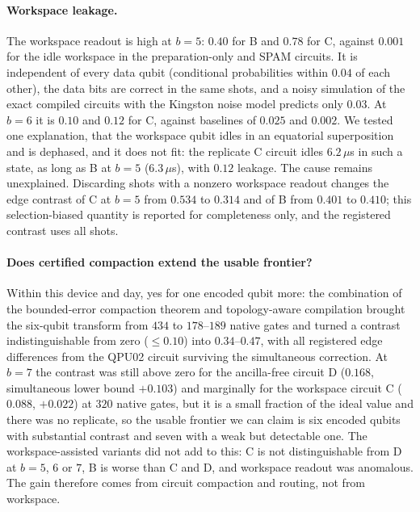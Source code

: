 \documentclass[11pt]{article}
\begin{document}
\paragraph{Workspace leakage.} The workspace readout is high at $b=5$: $0.40$ for B and $0.78$ for C, against $0.001$ for the idle workspace in the preparation-only and SPAM circuits. It is independent of every data qubit (conditional probabilities within $0.04$ of each other), the data bits are correct in the same shots, and a noisy simulation of the exact compiled circuits with the Kingston noise model predicts only $0.03$. At $b=6$ it is $0.10$ and $0.12$ for C, against baselines of $0.025$ and $0.002$. We tested one explanation, that the workspace qubit idles in an equatorial superposition and is dephased, and it does not fit: the replicate C circuit idles $6.2\,\mu$s in such a state, as long as B at $b=5$ ($6.3\,\mu$s), with $0.12$ leakage. The cause remains unexplained. Discarding shots with a nonzero workspace readout changes the edge contrast of C at $b=5$ from $0.534$ to $0.314$ and of B from $0.401$ to $0.410$; this selection-biased quantity is reported for completeness only, and the registered contrast uses all shots.

\paragraph{Does certified compaction extend the usable frontier?} Within this device and day, yes for one encoded qubit more: the combination of the bounded-error compaction theorem and topology-aware compilation brought the six-qubit transform from $434$ to $178$--$189$ native gates and turned a contrast indistinguishable from zero ($\le0.10$) into $0.34$--$0.47$, with all registered edge differences from the QPU02 circuit surviving the simultaneous correction. At $b=7$ the contrast was still above zero for the ancilla-free circuit D ($0.168$, simultaneous lower bound $+0.103$) and marginally for the workspace circuit C ($0.088$, $+0.022$) at $320$ native gates, but it is a small fraction of the ideal value and there was no replicate, so the usable frontier we can claim is six encoded qubits with substantial contrast and seven with a weak but detectable one. The workspace-assisted variants did not add to this: C is not distinguishable from D at $b=5$, $6$ or $7$, B is worse than C and D, and workspace readout was anomalous. The gain therefore comes from circuit compaction and routing, not from workspace.
\end{document}
